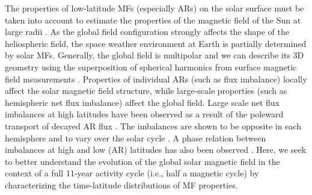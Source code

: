 \documentclass[namedreferences]{solarphysics}
\begin{document}
\begin{article}
The properties of low-latitude MFs (especially ARs) on the solar surface must be taken into account to estimate the properties of the magnetic field of the Sun at large radii \citep[e.g., the interplanetary magnetic field;]{Schatten:1969,wang:2003a, Schrijver:2003, schussler:2006}. As the global field configuration strongly affects the shape of the heliospheric field, the space weather environment at Earth is partially determined by solar MFs. Generally, the global field is multipolar and we can describe its 3D geometry using the superposition of spherical harmonics from surface magnetic field measurements \citep{stenflo:1986, stenflo:1988, knaack:2005,mordvinov:2007,Mackay:2012,DeRosa:2012}. Properties of individual ARs (such as flux imbalance) locally affect the solar magnetic field structure, while large-scale properties (such as hemispheric net flux imbalance) affect the global field.
Large scale net flux imbalances at high latitudes have been observed as a result of the poleward transport of decayed AR flux \citep{harvey:1992}. The imbalances are shown to be opposite in each hemisphere and to vary over the solar cycle \citep{Choudhary:2002}. A phase relation between imbalances at high and low (AR) latitudes has also been observed \citet{zharkov:2006,Zharkov:2008}.
Here, we seek to better understand the evolution of the global solar magnetic field in the context of a full 11-year activity cycle (i.e., half a magnetic cycle) by characterizing the time-latitude distributions of MF properties.



\end{article}
\end{document}
